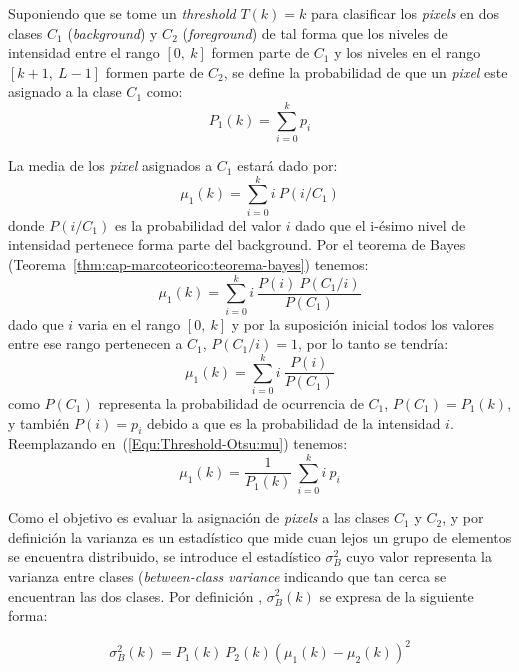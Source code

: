 Suponiendo que se tome un \textit{threshold} $T(k) = k$ para clasificar los 
\textit{pixels} en dos clases $C_1$ (\textit{background}) y $C_2$ 
(\textit{foreground}) de tal forma que los niveles de intensidad entre el 
rango $[0, ~k]$ formen parte de $C_1$ y los niveles en el rango 
$[k + 1, ~L - 1]$ formen parte de $C_2$, se define la probabilidad de que un 
\textit{pixel} este asignado a la clase $C_1$ como:
\begin{equation}
  P_1(k) = \sum_{i = 0}^{k}{p_i}
\end{equation}

La media de los \textit{pixel} asignados a $C_1$ estará dado por:
\begin{equation}
  \mu_1(k) = \sum_{i = 0}^{k}{i ~P(i / C_1)}
\end{equation}
donde $P(i / C_1)$ es la probabilidad del valor $i$ dado que el i-ésimo nivel 
de intensidad pertenece forma parte del background. Por el teorema de Bayes 
(Teorema~\ref{thm:cap-marcoteorico:teorema-bayes}) tenemos:
\begin{equation}
  \mu_1(k) = \sum_{i = 0}^{k}{i ~\frac{P(i) ~ P(C_1 / i)}{P(C_1)}}
\end{equation}
dado que $i$ varia en el rango $[0, ~k]$ y por la suposición inicial todos los
valores entre ese rango pertenecen a $C_1$, $P(C_1 / i) = 1$, por lo tanto se
tendría:
\begin{equation}
  \mu_1(k) = \sum_{i = 0}^{k}{i ~\frac{P(i)}{P(C_1)}}
  \label{Equ:Threshold-Otsu:mu}
\end{equation}
como $P(C_1)$ representa la probabilidad de ocurrencia de 
$C_1$, $P(C_1) = P_1(k)$, y también $P(i) = p_i$ debido a que es la
probabilidad de la intensidad $i$. Reemplazando 
en~(\ref{Equ:Threshold-Otsu:mu}) tenemos:
\begin{equation}
  \mu_1(k) = \frac{1}{P_1(k)} ~ \sum_{i = 0}^{k}{i \ p_i}
\end{equation}

Como el objetivo es evaluar la asignación de \textit{pixels} a las clases
$C_1$ y $C_2$, y por definición la varianza es un estadístico que mide cuan 
lejos un grupo de elementos se encuentra distribuido, se introduce el 
estadístico $\sigma_B^2$ cuyo valor representa la varianza entre clases 
(\textit{between-class variance} indicando que tan cerca se encuentran las dos
clases. Por definición \cite{Demirkaya:2004:DIBthreshold}, $\sigma_B^2(k)$ se
expresa de la siguiente forma:

\begin{equation}
  \sigma_B^2(k) = P_1(k) ~ P_2(k) ( \mu_1(k) - \mu_2(k))^2
\end{equation}

